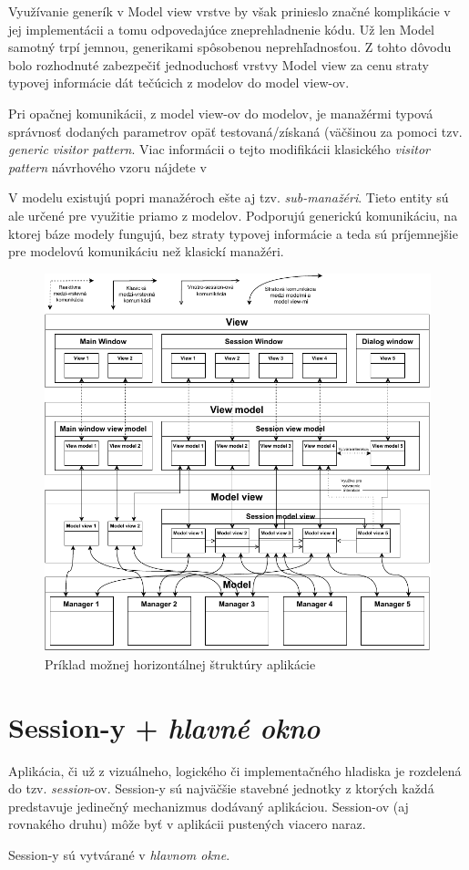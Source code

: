 Využívanie generík v Model view vrstve by však prinieslo značné komplikácie v jej implementácii a tomu odpovedajúce zneprehladnenie kódu. Už len Model samotný trpí jemnou, generikami spôsobenou neprehľadnosťou. Z tohto dôvodu bolo rozhodnuté zabezpečiť jednoduchosť vrstvy Model view za cenu straty typovej informácie dát tečúcich z modelov do model view-ov. 

Pri opačnej komunikácii, z model view-ov do modelov, je manažérmi typová správnosť dodaných parametrov opäť testovaná/získaná (väčšinou za pomoci tzv. \textit{generic visitor pattern}. Viac informácii o tejto modifikácii klasického \textit{visitor pattern} návrhového vzoru nájdete v %

V modelu existujú popri manažéroch ešte aj tzv. \textit{sub-manažéri}. Tieto entity sú ale určené pre využitie priamo z modelov. Podporujú generickú komunikáciu, na ktorej báze modely fungujú, bez straty typovej informácie a teda sú príjemnejšie pre modelovú komunikáciu než klasickí manažéri.     

\begin{figure}[h]\centering
\includegraphics[]{img/horizontalna_struktura}
\caption{Príklad možnej horizontálnej štruktúry aplikácie} 
\label{obr02:horizontalna_struktura}
\end{figure}

\pagebreak

\section{Session-y + \textit{hlavné okno}}\label{Sessions}

Aplikácia, či už z vizuálneho, logického či implementačného hladiska je rozdelená do tzv. \textit{session}-ov. Session-y sú najväčšie stavebné jednotky z ktorých každá predstavuje jedinečný mechanizmus dodávaný aplikáciou. Session-ov (aj rovnakého druhu) môže byť v aplikácii pustených viacero naraz.  

Session-y sú vytvárané v \textit{hlavnom okne}.



